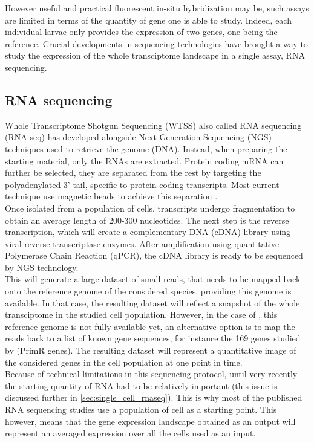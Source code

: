 	However useful and practical fluorescent in-situ hybridization may be, such assays are limited in terms of the quantity of gene one is able to study. Indeed, each individual larvae only provides the expression of two genes, one being the reference. Crucial developments in sequencing technologies have brought a way to study the expression of the whole transciptome landscape in a single assay, RNA sequencing.

     \subsection{RNA sequencing}
     Whole Transcriptome Shotgun Sequencing (WTSS) also called RNA sequencing (RNA-seq) \cite{morin08,wang09} has developed alongside Next Generation Sequencing (NGS) techniques used to retrieve the genome (DNA). Instead, when preparing the starting material, only the RNAs are extracted. Protein coding mRNA can further be selected, they are separated from the rest by targeting the polyadenylated 3' tail, specific to protein coding transcripts. Most current technique use magnetic beads to achieve this separation \cite{mortazavi08,morin08}.\\
     
    Once isolated from a population of cells, transcripts undergo fragmentation to obtain an average length of 200-300 nucleotides. The next step is the reverse transcription, which will create a complementary DNA (cDNA) library using viral reverse transcriptase enzymes. After amplification using quantitative Polymerase Chain Reaction (qPCR), the cDNA library is ready to be sequenced by NGS technology.\\
    
    This will generate a large dataset of small reads, that needs to be mapped back onto the reference genome of the considered species, providing this genome is available. In that case, the resulting dataset will reflect a snapshot of the whole transciptome in the studied cell population. However, in the case of \platy{}, this reference genome is not fully available yet, an alternative option is to map the reads back to a list of known gene sequences, for instance the 169 genes studied by \cite{Tomer10} (PrimR genes). The resulting dataset will represent a quantitative image of the considered genes in the cell population at one point in time.\\
    
    Because of technical limitations in this sequencing protocol, until very recently the starting quantity of RNA had to be relatively important (this issue is discussed further in \ref{sec:single_cell_rnaseq}). This is why most of the published RNA sequencing studies use a population of cell as a starting point. This however, means that the gene expression landscape obtained as an output will represent an averaged expression over all the cells used as an input.\\
    
